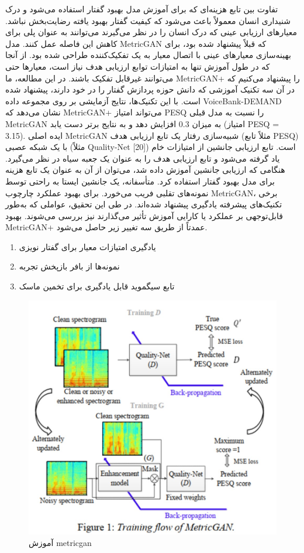 \documentclass[fleqn]{report}
\begin{document}
تفاوت بین تابع هزینه‌ای که برای آموزش مدل بهبود گفتار استفاده می‌شود و درک شنیداری انسان معمولاً باعث می‌شود که کیفیت گفتار بهبود یافته رضایت‌بخش نباشد. معیارهای ارزیابی عینی که درک انسان را در نظر می‌گیرند می‌توانند به عنوان پلی برای کاهش این فاصله عمل کنند. مدل MetricGAN که قبلاً پیشنهاد شده بود، برای بهینه‌سازی معیارهای عینی با اتصال معیار به یک تفکیک‌کننده طراحی شده بود. از آنجا که در طول آموزش تنها به امتیازات توابع ارزیابی هدف نیاز است، معیارها حتی می‌توانند غیرقابل تفکیک باشند. در این مطالعه، ما MetricGAN+ را پیشنهاد می‌کنیم که در آن سه تکنیک آموزشی که دانش حوزه پردازش گفتار را در خود دارند، پیشنهاد شده است. با این تکنیک‌ها، نتایج آزمایشی بر روی مجموعه داده VoiceBank-DEMAND نشان می‌دهد که MetricGAN+ می‌تواند امتیاز PESQ را نسبت به مدل قبلی MetricGAN به میزان 0.3 افزایش دهد و به نتایج برتر دست یابد (امتیاز PESQ = 3.15).
ایده اصلی MetricGAN شبیه‌سازی رفتار یک تابع ارزیابی هدف (مثلاً تابع PESQ) با یک شبکه عصبی (مثلاً Quality-Net [20]) است. تابع ارزیابی جانشین از امتیازات خام یاد گرفته می‌شود و تابع ارزیابی هدف را به عنوان یک جعبه سیاه در نظر می‌گیرد. هنگامی که ارزیابی جانشین آموزش داده شد، می‌توان از آن به عنوان یک تابع هزینه برای مدل بهبود گفتار استفاده کرد. متأسفانه، یک جانشین ایستا به راحتی توسط نمونه‌های تقلبی فریب می‌خورد.
برای بهبود عملکرد چارچوب MetricGAN، برخی تکنیک‌های پیشرفته یادگیری پیشنهاد شده‌اند. در طی این تحقیق، عواملی که به‌طور قابل‌توجهی بر عملکرد یا کارایی آموزش تأثیر می‌گذارند نیز بررسی می‌شوند. بهبود MetricGAN+ عمدتاً از طریق سه تغییر زیر حاصل می‌شود.
\begin{enumerate}
    \item یادگیری امتیازات معیار برای گفتار نویزی
    \item نمونه‌ها از بافر بازپخش تجربه
    \item تابع سیگموید قابل یادگیری برای تخمین ماسک
\end{enumerate}

\begin{figure}[h]

    \centering
    \includegraphics[width=.6\textwidth, keepaspectratio]{images/metricgan.jpg}
    
    \caption{آموزش metricgan}
    \label{fig:metricgan-training}
\end{figure}
\end{document}

